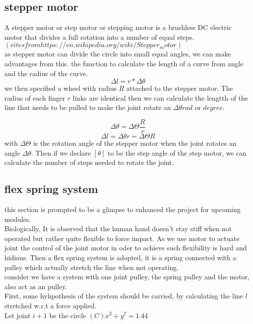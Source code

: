 \documentclass[conference]{IEEEtran}
\begin{document}
\subsection{stepper motor}
A stepper motor or step motor or stepping motor is a brushless DC electric motor that divides a full rotation into a number of equal steps.$(cites from https://en.wikipedia.org/wiki/Stepper_motor)$ 
\\
as stepper motor can divide the circle into small equal angles, we can make advantages from this. the function to calculate the length of a curve from angle and the radius of the curve.
\begin{equation}
	\Delta l=r*\Delta\theta 
\end{equation}
we then specified a wheel with radius $R$ attached to the stepper motor. The radius of each finger $r$ links are identical
then we can calculate the lengtth of the line that needs to be pulled to make the joint rotate an $\Delta\theta rad$ or $degree$. 

\begin{equation}
	\Delta\theta = \Delta\Theta \frac{R}{r}
\end{equation}
\begin{equation}
    \Delta l=\Delta\theta r=\Delta\Theta R
\end{equation}
with $\Delta\Theta$ is the rotation angle of the stepper motor when the joint rotates an angle $\Delta\theta$. Then if we declare $[\theta]$ to be the step angle of the step motor, we can calculate the number of steps needed to rotate the joint.
 
\subsection{flex spring system}
this section is prompted to be a glimpse to enhanced the project for upcoming modules.\\
Biologically, It is observed that the human hand doesn't stay stiff when not operated but rather quite flexible to force impact. As we use motor to actuate joint the control of the joint motor in oder to achieve such flexibility is hard and hidious. Then a flex spring system is adopted, it is a spring connected with a pulley which actually stretch the line when not operating.\\
consider we have a system with one joint pulley, the spring pulley and the motor, also act as an pulley.\\
First, some hyhpothesis of the system should be carried, by calculating the line $l$ stretched w.r.t a force applied.
\\
Let joint $i+1$ be the circle $(C)x^2+y^2=1.44$ 
\\
\end{document}
